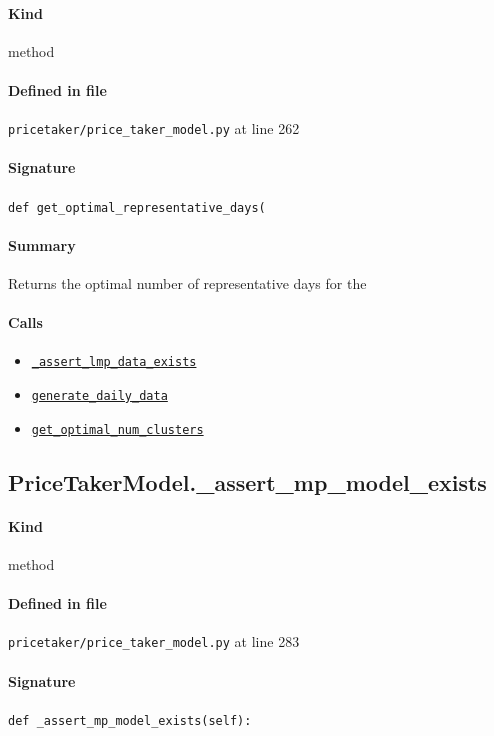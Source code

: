 \documentclass[11pt]{report}
\begin{document}
\paragraph{Kind} method
\paragraph{Defined in file} \texttt{pricetaker/price\_taker\_model.py} at line 262
\paragraph{Signature} \texttt{def get\_optimal\_representative\_days(}
\paragraph{Summary} Returns the optimal number of representative days for the
\paragraph{Calls}
\begin{itemize}[leftmargin=*]
  \item \hyperref[def:pricetaker-price_taker_model.py:PriceTakerModel._assert_lmp_data_exists:L213]{\texttt{\_assert\_lmp\_data\_exists}}
  \item \hyperref[def:pricetaker-clustering.py:generate_daily_data:L35]{\texttt{generate\_daily\_data}}
  \item \hyperref[def:pricetaker-clustering.py:get_optimal_num_clusters:L142]{\texttt{get\_optimal\_num\_clusters}}
\end{itemize}
\subsection{PriceTakerModel.\_assert\_mp\_model\_exists}
\label{def:pricetaker-price_taker_model.py:PriceTakerModel._assert_mp_model_exists:L283}
\paragraph{Kind} method
\paragraph{Defined in file} \texttt{pricetaker/price\_taker\_model.py} at line 283
\paragraph{Signature} \texttt{def \_assert\_mp\_model\_exists(self):}
\end{document}
